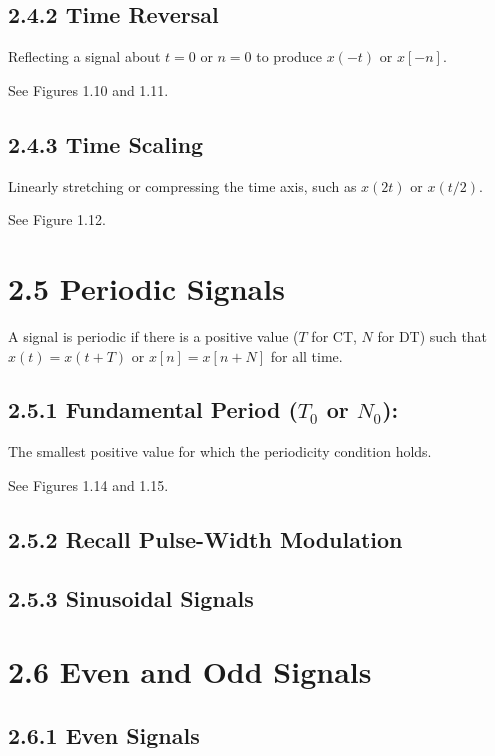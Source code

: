 \documentclass[11pt]{article}
\begin{document}
\subsection*{2.4.2 Time Reversal}

Reflecting a signal about $t = 0$ or $n = 0$ to produce $x(-t)$ or $x[-n]$.

See Figures 1.10 and 1.11.

\subsection*{2.4.3 Time Scaling}

Linearly stretching or compressing the time axis, such as $x(2t)$ or $x(t/2)$.

See Figure 1.12.

\section*{2.5 Periodic Signals}

A signal is periodic if there is a positive value ($T$ for CT, $N$ for DT) such that $x(t) = x(t + T)$ or $x[n] = x[n + N]$ for all time.

\subsection*{2.5.1 Fundamental Period ($T_0$ or $N_0$):}

The smallest positive value for which the periodicity condition holds.

See Figures 1.14 and 1.15.

\subsection*{2.5.2 Recall Pulse-Width Modulation}

\subsection*{2.5.3 Sinusoidal Signals}

\section*{2.6 Even and Odd Signals}

\subsection*{2.6.1 Even Signals}
\end{document}
